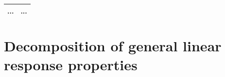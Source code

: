 \documentclass[%
    xcolor=usenames,dvipsnames,svgnames%
]{beamer}
\newenvironment{nscenter}
 {\parskip=0pt\par\nopagebreak\centering}
 {\par\noindent\ignorespacesafterend}
\begin{document}
\begin{frame}
\begin{nscenter}
\begin{tabulary}{1.00\linewidth}{rL}
      ... & ... \\
      \bottomrule
    \end{tabulary}
  \end{nscenter}
\end{frame}

\section{Decomposition of general linear response properties}
\end{document}
